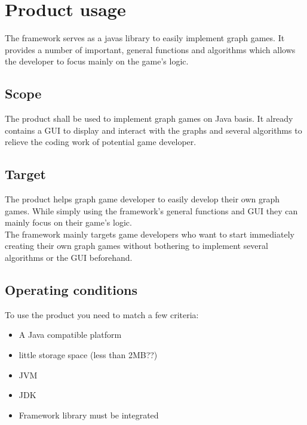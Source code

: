 \section{Product usage}
The \gls{framework} serves as a \glspl{java} \gls{library} to easily implement \gls{graph} games. It provides a number of important, general functions and algorithms which allows the \gls{developer} to focus mainly on the game's logic.

\subsection{Scope}
The product shall be used to implement graph games on Java basis. It already contains a \gls{GUI} to display and interact with the graphs and several algorithms to relieve the coding work of potential game developer.

\subsection{Target}
The product helps graph game developer to easily develop their own graph games. While simply using the framework's general functions and \gls{GUI} they can mainly focus on their game's logic. \\
The framework mainly targets game developers who want to start immediately creating their own graph games without bothering to implement several algorithms or the \gls{GUI} beforehand.

\subsection{Operating conditions} 
To use the product you need to match a few criteria:
\begin{itemize}
\item A Java compatible platform
\item little storage space (less than 2MB??)
\item \gls{JVM}
\item \gls{JDK}
\item Framework library must be integrated
\end{itemize}